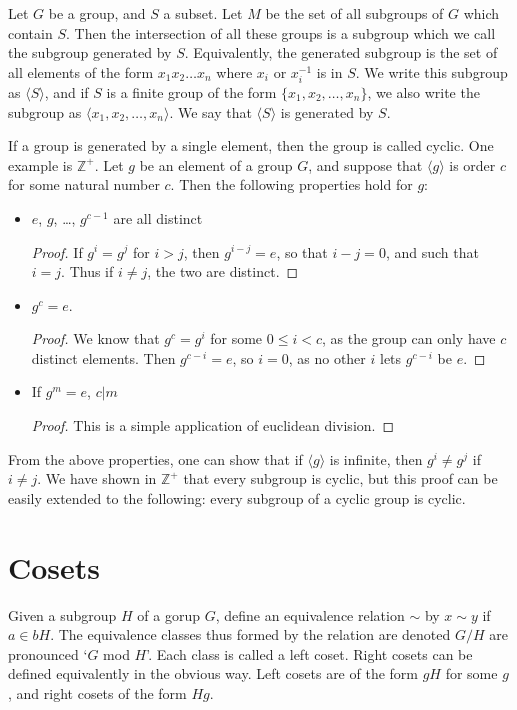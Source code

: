 \documentclass{report}
\begin{document}
Let $G$ be a group, and $S$ a subset. Let $M$ be the set of all subgroups of $G$ which contain $S$. Then the intersection of all these groups is a subgroup which we call the subgroup generated by $S$. Equivalently, the generated subgroup is the set of all elements of the form $x_1 x_2 \dots x_n$ where $x_i$ or $x_i^{-1}$ is in $S$. We write this subgroup as $\langle S \rangle$, and if $S$ is a finite group of the form $\{ x_1, x_2, \dots, x_n \}$, we also write the subgroup as $\langle x_1, x_2, \dots, x_n \rangle$. We say that $\langle S \rangle$ is generated by $S$.

If a group is generated by a single element, then the group is called cyclic. One example is $\mathbb{Z}^+$. Let $g$ be an element of a group $G$, and suppose that $\langle g \rangle$ is order $c$ for some natural number $c$. Then the following properties hold for $g$:
\begin{itemize}
    \item $e$, $g$, \dots, $g^{c-1}$ are all distinct
    \begin{proof} If $g^i = g^j$ for $i > j$, then $g^{i - j} = e$, so that $i - j = 0$, and such that $i = j$. Thus if $i \neq j$, the two are distinct. \end{proof}

    \item $g^c = e$.
    \begin{proof} We know that $g^c = g^i$ for some $0 \leq i < c$, as the group can only have $c$ distinct elements. Then $g^{c - i} = e$, so $i = 0$, as no other $i$ lets $g^{c - i}$ be $e$. \end{proof}

    \item If $g^m = e$, $c | m$
    \begin{proof} This is a simple application of euclidean division. \end{proof}
\end{itemize}

From the above properties, one can show that if $\langle g \rangle$ is infinite, then $g^i \neq g^j$ if $i \neq j$. We have shown in $\mathbb{Z}^+$ that every subgroup is cyclic, but this proof can be easily extended to the following: every subgroup of a cyclic group is cyclic.

\section{Cosets}

Given a subgroup $H$ of a gorup $G$, define an equivalence relation $\sim$ by $x \sim y$ if $a \in bH$. The equivalence classes thus formed by the relation are denoted $G/H$ are pronounced `$G$ mod $H$'. Each class is called a left coset. Right cosets can be defined equivalently in the obvious way. Left cosets are of the form $gH$ for some $g$, and right cosets of the form $Hg$.
\end{document}
